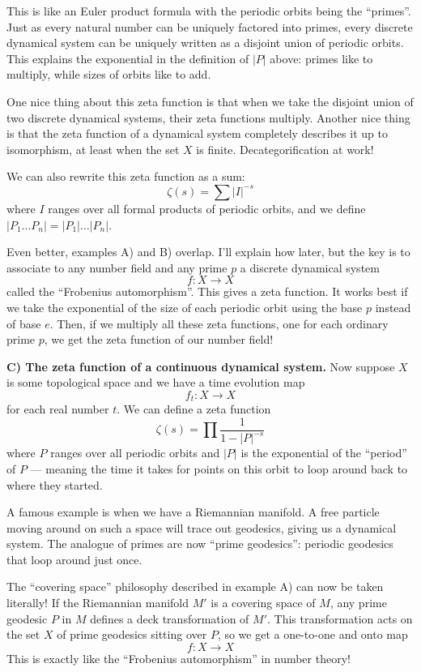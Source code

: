 \documentclass{article}
\begin{document}
This is like an Euler product formula with the periodic orbits being the
``primes''. Just as every natural number can be uniquely factored into
primes, every discrete dynamical system can be uniquely written as a
disjoint union of periodic orbits. This explains the exponential in the
definition of \(|P|\) above: primes like to multiply, while sizes of
orbits like to add.

One nice thing about this zeta function is that when we take the
disjoint union of two discrete dynamical systems, their zeta functions
multiply. Another nice thing is that the zeta function of a dynamical
system completely describes it up to isomorphism, at least when the set
\(X\) is finite. Decategorification at work!

We can also rewrite this zeta function as a sum:
\[\zeta(s) = \sum |I|^{-s}\] where \(I\) ranges over all formal products
of periodic orbits, and we define
\(|P_1 \ldots P_n| = |P_1| \ldots |P_n|\).

Even better, examples A) and B) overlap. I'll explain how later, but the
key is to associate to any number field and any prime \(p\) a discrete
dynamical system \[f\colon X \to X\] called the ``Frobenius
automorphism''. This gives a zeta function. It works best if we take the
exponential of the size of each periodic orbit using the base \(p\)
instead of base \(e\). Then, if we multiply all these zeta functions,
one for each ordinary prime \(p\), we get the zeta function of our
number field!

\textbf{C) The zeta function of a continuous dynamical system.} Now
suppose \(X\) is some topological space and we have a time evolution map
\[f_t\colon X \to X\] for each real number \(t\). We can define a zeta
function \[\zeta(s) = \prod \frac{1}{1 - |P|^{-s}}\] where \(P\) ranges
over all periodic orbits and \(|P|\) is the exponential of the
``period'' of \(P\) --- meaning the time it takes for points on this
orbit to loop around back to where they started.

A famous example is when we have a Riemannian manifold. A free particle
moving around on such a space will trace out geodesics, giving us a
dynamical system. The analogue of primes are now ``prime geodesics'':
periodic geodesics that loop around just once.

The ``covering space'' philosophy described in example A) can now be
taken literally! If the Riemannian manifold \(M'\) is a covering space
of \(M\), any prime geodesic \(P\) in \(M\) defines a deck
transformation of \(M'\). This transformation acts on the set \(X\) of
prime geodesics sitting over \(P\), so we get a one-to-one and onto map
\[f\colon X \to X\] This is exactly like the ``Frobenius automorphism''
in number theory!
\end{document}
